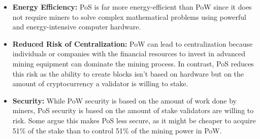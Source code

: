 \begin{itemize}
    \item \textbf{Energy Efficiency:} PoS is far more energy-efficient than PoW since it does not require miners to solve complex mathematical problems using powerful and energy-intensive computer hardware.
    \item \textbf{Reduced Risk of Centralization:} PoW can lead to centralization because individuals or companies with the financial resources to invest in advanced mining equipment can dominate the mining process. In contrast, PoS reduces this risk as the ability to create blocks isn't based on hardware but on the amount of cryptocurrency a validator is willing to stake.
    \item \textbf{Security:} While PoW security is based on the amount of work done by miners, PoS security is based on the amount of stake validators are willing to risk. Some argue this makes PoS less secure, as it might be cheaper to acquire 51\% of the stake than to control 51\% of the mining power in PoW.
\end{itemize}